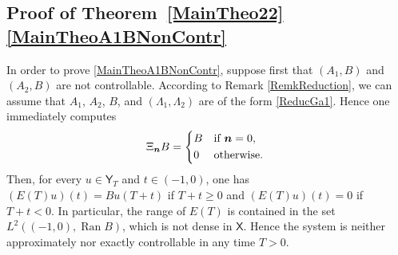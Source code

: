 \documentclass[JEP,XML,SOM,Unicode]{cedram}
\newcommand{\bn}{\boldsymbol{n}}
\theoremstyle{plain}
\theoremstyle{definition}
\DeclareMathOperator{\range}{Ran}
\begin{document}
\subsection{Proof of Theorem~\ref{MainTheo22}\eqref{MainTheoA1BNonContr}}

In order to prove \eqref{MainTheoA1BNonContr}, suppose first that $(A_1, B)$ and $(A_2, B)$ are not controllable. According to Remark \ref{RemkReduction}, we can assume that $A_1$, $A_2$, $B$, and $(\Lambda_1, \Lambda_2)$ are of the form \eqref{ReducGa1}. Hence one immediately computes
\[
\Xi_{\bn} B =
\begin{dcases*}
B & if $\bn = 0$, \\
0 & otherwise.
\end{dcases*}
\]
Then, for every $u \in \mathsf Y_T$ and $t \in (-1, 0)$, one has $(E(T) u)(t) = B u(T + t)$ if $T + t \geq 0$ and $(E(T) u)(t) = 0$ if $T + t < 0$. In particular, the range of $E(T)$ is contained in the set $L^2((-1, 0), \range B)$, which is not dense in $\mathsf X$. Hence the system is neither approximately nor exactly controllable in any time $T > 0$.
\end{document}
